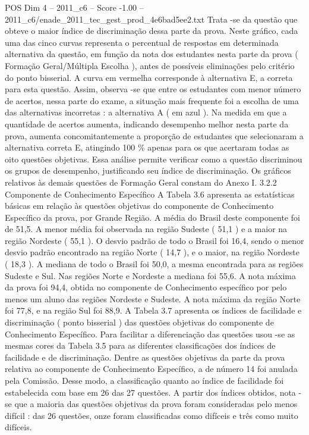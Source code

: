 \begin{textsample}{POS Dim 4 – 2011\_c6 – Score -1.00 – 2011\_c6/enade\_2011\_tec\_gest\_prod\_4e6bad5ee2.txt}
Trata -se da questão que obteve o maior índice de discriminação dessa parte da prova.
Neste gráfico, cada uma das cinco curvas representa o percentual de respostas em determinada alternativa da questão, em função da nota dos estudantes nesta parte da prova ( Formação Geral/Múltipla Escolha ), antes de possíveis eliminações pelo critério do ponto bisserial.
A curva em vermelha corresponde à alternativa E, a correta para esta questão.
Assim, observa -se que entre os estudantes com menor número de acertos, nessa parte do exame, a situação mais frequente foi a escolha de uma das alternativas incorretas : a alternativa A ( em azul ).
Na medida em que a quantidade de acertos aumenta, indicando desempenho melhor nesta parte da prova, aumenta concomitantemente a proporção de estudantes que selecionaram a alternativa correta E, atingindo 100 \% apenas para os que acertaram todas as oito questões objetivas.
Essa análise permite verificar como a questão discriminou os grupos de desempenho, justificando seu índice de discriminação.
Os gráficos relativos às demais questões de Formação Geral constam do Anexo I. 3.2.2 Componente de Conhecimento Específico A Tabela 3.6 apresenta as estatísticas básicas em relação às questões objetivas do componente de Conhecimento Específico da prova, por Grande Região.
A média do Brasil deste componente foi de 51,5.
A menor média foi observada na região Sudeste ( 51,1 ) e a maior na região Nordeste ( 55,1 ).
O desvio padrão de todo o Brasil foi 16,4, sendo o menor desvio padrão encontrado na região Norte ( 14,7 ), e o maior, na região Nordeste ( 18,3 ).
A mediana de todo o Brasil foi 50,0, a mesma encontrada para as regiões Sudeste e Sul.
Nas regiões Norte e Nordeste a mediana foi 55,6.
A nota máxima da prova foi 94,4, obtida no componente de Conhecimento específico por pelo menos um aluno das regiões Nordeste e Sudeste.
A nota máxima da região Norte foi 77,8, e na região Sul foi 88,9.
A Tabela 3.7 apresenta os índices de facilidade e discriminação ( ponto bisserial ) das questões objetivas do componente de Conhecimento Específico.
Para facilitar a diferenciação das questões usou -se as mesmas cores da Tabela 3.5 para as diferentes classificações dos índices de facilidade e de discriminação.
Dentre as questões objetivas da parte da prova relativa ao componente de Conhecimento Específico, a de número 14 foi anulada pela Comissão.
Desse modo, a classificação quanto ao índice de facilidade foi estabelecida com base em 26 das 27 questões.
A partir dos índices obtidos, nota -se que a maioria das questões objetivas da prova foram consideradas pelo menos difícil : das 26 questões, onze foram classificadas como difíceis e três como muito difíceis.

\end{textsample}
